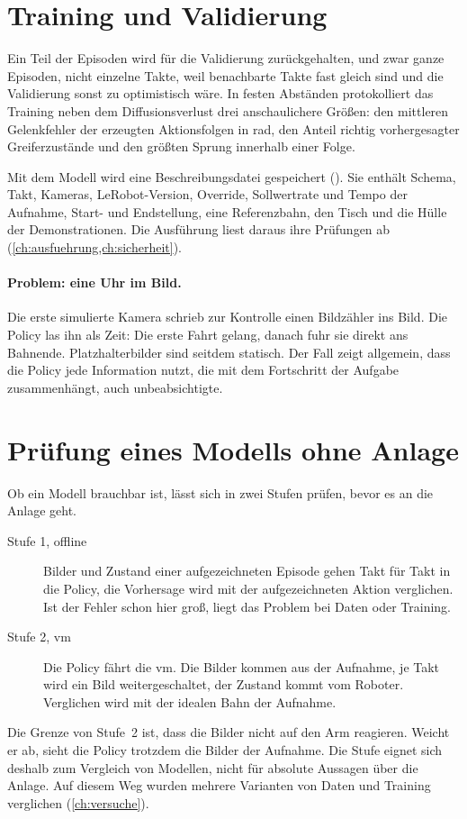\section{Training und Validierung}
\label{sec:validierung}

Ein Teil der Episoden wird für die Validierung zurückgehalten, und zwar ganze Episoden, nicht
einzelne Takte, weil benachbarte Takte fast gleich sind und die Validierung sonst zu
optimistisch wäre. In festen Abständen protokolliert das Training neben dem Diffusionsverlust
drei anschaulichere Größen: den mittleren Gelenkfehler der erzeugten Aktionsfolgen in rad,
den Anteil richtig vorhergesagter Greiferzustände und den größten Sprung innerhalb einer
Folge.

Mit dem Modell wird eine Beschreibungsdatei gespeichert (). Sie enthält
Schema, Takt, Kameras, LeRobot-Version, Override, Sollwertrate und Tempo der Aufnahme, Start-
und Endstellung, eine Referenzbahn, den Tisch und die Hülle der Demonstrationen. Die
Ausführung liest daraus ihre Prüfungen ab (\cref{ch:ausfuehrung,ch:sicherheit}).

\paragraph{Problem: eine Uhr im Bild.} Die erste simulierte Kamera schrieb zur Kontrolle einen
Bildzähler ins Bild. Die Policy las ihn als Zeit: Die erste Fahrt gelang, danach fuhr sie direkt
ans Bahnende. Platzhalterbilder sind seitdem statisch. Der Fall zeigt allgemein, dass die
Policy jede Information nutzt, die mit dem Fortschritt der Aufgabe zusammenhängt, auch
unbeabsichtigte.

\section{Prüfung eines Modells ohne Anlage}
\label{sec:replay}

Ob ein Modell brauchbar ist, lässt sich in zwei Stufen prüfen, bevor es an die Anlage geht.

\begin{description}
  \item[Stufe 1, offline] Bilder und Zustand einer aufgezeichneten Episode gehen Takt für Takt
    in die Policy, die Vorhersage wird mit der aufgezeichneten Aktion verglichen. Ist der
    Fehler schon hier groß, liegt das Problem bei Daten oder Training.
  \item[Stufe 2, \acs{vm}] Die Policy fährt die \ac{vm}. Die Bilder kommen aus der Aufnahme, je
    Takt wird ein Bild weitergeschaltet, der Zustand kommt vom Roboter. Verglichen wird mit der
    idealen Bahn der Aufnahme.
\end{description}
Die Grenze von Stufe~2 ist, dass die Bilder nicht auf den Arm reagieren. Weicht er ab, sieht die
Policy trotzdem die Bilder der Aufnahme. Die Stufe eignet sich deshalb zum Vergleich von
Modellen, nicht für absolute Aussagen über die Anlage. Auf diesem Weg wurden mehrere
Varianten von Daten und Training verglichen (\cref{ch:versuche}).
